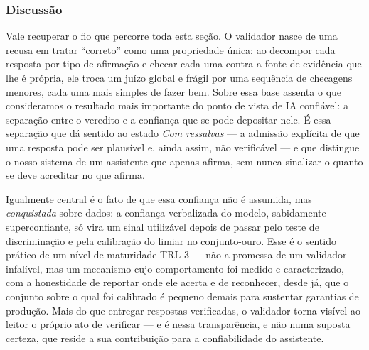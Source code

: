 \subsubsection*{Discussão}
\label{subsubsec:discussao-validacao}

Vale recuperar o fio que percorre toda esta seção. O validador nasce de uma recusa em tratar ``correto'' como uma propriedade única: ao decompor cada resposta por tipo de afirmação e checar cada uma contra a fonte de evidência que lhe é própria, ele troca um juízo global e frágil por uma sequência de checagens menores, cada uma mais simples de fazer bem. Sobre essa base assenta o que consideramos o resultado mais importante do ponto de vista de IA confiável: a separação entre o veredito e a confiança que se pode depositar nele. É essa separação que dá sentido ao estado \textit{Com ressalvas} --- a admissão explícita de que uma resposta pode ser plausível e, ainda assim, não verificável --- e que distingue o nosso sistema de um assistente que apenas afirma, sem nunca sinalizar o quanto se deve acreditar no que afirma.

Igualmente central é o fato de que essa confiança não é assumida, mas \textit{conquistada} sobre dados: a confiança verbalizada do modelo, sabidamente superconfiante, só vira um sinal utilizável depois de passar pelo teste de discriminação e pela calibração do limiar no conjunto-ouro. Esse é o sentido prático de um nível de maturidade TRL 3 --- não a promessa de um validador infalível, mas um mecanismo cujo comportamento foi medido e caracterizado, com a honestidade de reportar onde ele acerta e de reconhecer, desde já, que o conjunto sobre o qual foi calibrado é pequeno demais para sustentar garantias de produção. Mais do que entregar respostas verificadas, o validador torna visível ao leitor o próprio ato de verificar --- e é nessa transparência, e não numa suposta certeza, que reside a sua contribuição para a confiabilidade do assistente.
